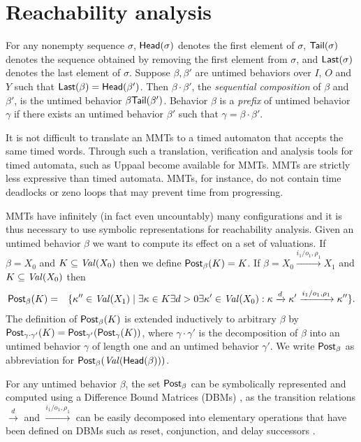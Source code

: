 \section{Reachability analysis}
For any nonempty sequence $\sigma$, $\mathsf{Head}({\sigma})$ denotes the first element of $\sigma$, $\mathsf{Tail}({\sigma})$ denotes the sequence obtained by removing the first element from $\sigma$, and $\mathsf{Last}({\sigma})$ denotes the last element of $\sigma$.
Suppose $\beta, \beta'$ are untimed behaviors over $I$, $O$ and $Y$ such that $\mathsf{Last}({\beta}) = \mathsf{Head}({\beta'})$.
Then $\beta \cdot \beta'$, the \emph{sequential composition} of $\beta$ and $\beta'$, is the untimed behavior $\beta \mathsf{Tail}({\beta'})$.
Behavior $\beta$ is a \emph{prefix} of untimed behavior $\gamma$ if there exists an untimed behavior $\beta'$ such that $\gamma = \beta \cdot \beta'$.

It is not difficult to translate an MMTs to a timed automaton \cite{AD94,BengtssonY03} that accepts the same timed words.
Through such a translation, verification and analysis tools for timed automata, such as Uppaal \cite{Uppaal4.0}
become available for MMTs.
MMTs are strictly less expressive than timed automata. MMTs, for instance, do not contain time deadlocks or zeno loops that
may prevent time from progressing.

MMTs have infinitely (in fact even uncountably) many configurations and it is thus necessary to use symbolic representations
for reachability analysis. Given an untimed behavior $\beta$ we want to compute its effect on a set of valuations. 
If $\beta =X_0$ and $K \subseteq\mathit{Val}({X_0})$ then we define $\mathsf{Post}_{\beta}(K) = K$.
If $\beta = X_0 \xrightarrow{i_1/o_1, \rho_1} X_1$ and
$K \subseteq\mathit{Val}({X_0})$ then
\begin{eqnarray*}
\mathsf{Post}_{\beta}(K) & = & \{ \kappa'' \in\mathit{Val}({X_1}) \mid \exists \kappa \in K \exists d >0 \exists \kappa' \in\mathit{Val}({X_0}) :
 \kappa \xrightarrow{d} \kappa' \xrightarrow{i_1/o_1, \rho_1} \kappa'' \}.
\end{eqnarray*}
The definition of $\mathsf{Post}_{\beta}(K)$ is extended inductively to arbitrary $\beta$ by 
$\mathsf{Post}_{\gamma \cdot \gamma'}(K) = \mathsf{Post}_{\gamma'} (\mathsf{Post}_{\gamma}(K))$, where $\gamma \cdot \gamma'$ is the decomposition of
$\beta$ into an untimed behavior $\gamma$ of length one and an untimed behavior $\gamma'$.
We write $\mathsf{Post}_{\beta}$ as abbreviation for $\mathsf{Post}_{\beta}(\mathit{Val}({\mathsf{Head}({\beta})}))$.

For any untimed behavior $\beta$, the set $\mathsf{Post}_{\beta}$ can be symbolically represented and computed using a Difference Bound Matrices (DBMs)
 \cite{Di89},  as the transition relations $\xrightarrow{d}$ and $\xrightarrow{i_1/o_1, \rho_1}$ can be easily decomposed 
into elementary operations that have been defined
on DBMs such as reset, conjunction, and delay successors \cite{BengtssonY03}.

